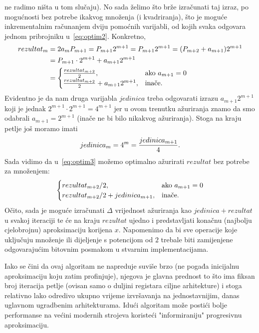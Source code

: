 \documentclass[12pt]{scrartcl}
\begin{document}
ne radimo ništa u tom slučaju). No sada želimo što brže izračunati taj izraz, po mogućnosti bez potrebe ikakvog množenja (i kvadriranja), što je moguće
inkrementalnim računanjem dviju pomoćnih varijabli, od kojih svaka odgovara jednom pribrojniku u~\eqref{eq:optim2}. Konkretno,
\begin{equation}\label{eq:optim3}
    \begin{aligned}
    rezultat_m &= 2a_mP_{m+1}=P_{m+1}2^{m+1}=P_{m+1}2^{m+1}=(P_{m+2}+a_{m+1})2^{m+1}\\
    &=P_{m+1}\cdot 2^{m+1}+a_{m+1}2^{m+1}\\
    &=\begin{cases}
        \frac{rezultat_{m+2}}{2},&\text{ako $a_{m+1}=0$}\\
        \frac{rezultat_{m+2}}{2} + a_{m+1}2^{m+1},&\text{inače}\text.
    \end{cases}
    \end{aligned}
\end{equation}
Evidentno je da nam druga varijabla $jedinica$ treba odgovarati izrazu $a_{m+1}2^{m+1}$ koji je jednak $2^{m+1}\cdot 2^{m+1}=4^{m+1}$ jer
u ovom trenutku ažuriranja znamo da smo odabrali $a_{m+1}=2^{m+1}$ (inače ne bi bilo nikakvog ažuriranja). Stoga na kraju petlje još moramo imati
\begin{equation}
    jedinica_m=4^m=\frac{jedinica_{m+1}}{4}\text.
\end{equation}
Sada vidimo da u~\eqref{eq:optim3} možemo optimalno ažurirati $rezultat$ bez potrebe za množenjem:
\begin{equation}
    \begin{cases}
        rezultat_{m+2}/2,&\text{ako $a_{m+1}=0$}\\
        rezultat_{m+2}/2 + jedinica_{m+1},&\text{inače}\text.
    \end{cases}
\end{equation}
Očito, sada je moguće izračunati $\Delta$ vrijednost ažuriranja kao $jedinica+rezultat$ u svakoj iteraciji te će na kraju $rezultat$ ujedno i
predstavljati konačnu (najbolju cjelobrojnu) aproksimaciju korijena $x$. Napomenimo da bi sve operacije koje uključuju množenje ili dijeljenje s
potencijom od $2$ trebale biti zamijenjene odgovarajućim bitovnim posmakom u stvarnim implementacijama.

Iako se čini da ovaj algoritam ne napreduje suviše brzo (ne pogađa inicijalnu aproksimaciju koju zatim profinjuje), njegova je
glavna prednost to što ima fiksan broj iteracija petlje
(ovisan samo o duljini registara ciljne arhitekture) i stoga relativno lako odredivo ukupno
vrijeme izvršavanja na jednostavnijim, danas uglavnom ugradbenim arhitekturama. Idući algoritam može postići bolje performanse na većini
modernih strojeva koristeći "informiraniju" progresivnu aproksimaciju.
\end{document}
